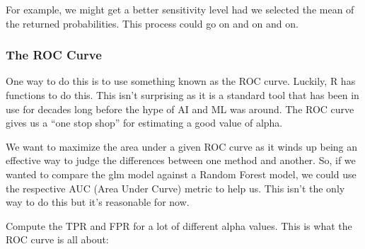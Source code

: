 \documentclass[
]{article}
\newenvironment{Shaded}{\begin{snugshade}}{\end{snugshade}}
\newcommand{\AttributeTok}[1]{\textcolor[rgb]{0.77,0.63,0.00}{#1}}
\newcommand{\DecValTok}[1]{\textcolor[rgb]{0.00,0.00,0.81}{#1}}
\newcommand{\FloatTok}[1]{\textcolor[rgb]{0.00,0.00,0.81}{#1}}
\newcommand{\FunctionTok}[1]{\textcolor[rgb]{0.00,0.00,0.00}{#1}}
\newcommand{\NormalTok}[1]{#1}
\newcommand{\OtherTok}[1]{\textcolor[rgb]{0.56,0.35,0.01}{#1}}
\newcommand{\SpecialCharTok}[1]{\textcolor[rgb]{0.00,0.00,0.00}{#1}}
\newcommand{\StringTok}[1]{\textcolor[rgb]{0.31,0.60,0.02}{#1}}
\begin{document}
For example, we might get a better sensitivity level had we selected the
mean of the returned probabilities. This process could go on and on and
on.

\hypertarget{the-roc-curve}{%
\subsubsection{The ROC Curve}\label{the-roc-curve}}

One way to do this is to use something known as the ROC curve. Luckily,
R has functions to do this. This isn't surprising as it is a standard
tool that has been in use for decades long before the hype of AI and ML
was around. The ROC curve gives us a ``one stop shop'' for estimating a
good value of alpha.

We want to maximize the area under a given ROC curve as it winds up
being an effective way to judge the differences between one method and
another. So, if we wanted to compare the glm model against a Random
Forest model, we could use the respective AUC (Area Under Curve) metric
to help us. This isn't the only way to do this but it's reasonable for
now.

Compute the TPR and FPR for a lot of different alpha values. This is
what the ROC curve is all about:

\begin{Shaded}
\end{Shaded}
\end{document}

